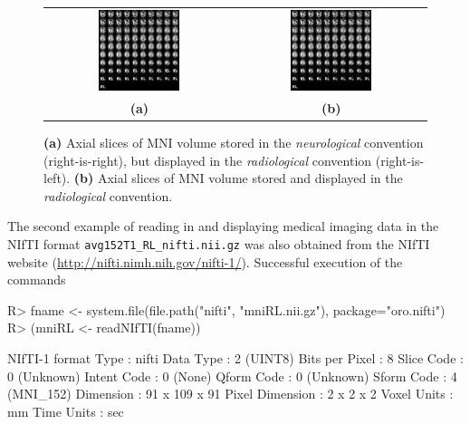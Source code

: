 \documentclass[
]{article}
\begin{document}
\begin{figure}[tbp]
  \begin{center}
    \begin{tabular}{cc}
      \includegraphics*[width=0.45\textwidth]{mniLR.jpeg} &
      \includegraphics*[width=0.45\textwidth]{mniRL.jpeg}\\
      \textbf{(a)} & \textbf{(b)}
    \end{tabular}
  \end{center}
  \caption{\textbf{(a)} Axial slices of MNI volume 
    stored in the \emph{neurological} convention (right-is-right), but
    displayed in the \emph{radiological} convention (right-is-left).
    \textbf{(b)} Axial slices of MNI volume  stored
    and displayed in the \emph{radiological} convention.}
  \label{fig:mniLR+mniRL}
\end{figure}

The second example of reading in and displaying medical imaging data in
the NIfTI format \texttt{avg152T1\_RL\_nifti.nii.gz} was also obtained
from the NIfTI website (\url{http://nifti.nimh.nih.gov/nifti-1/}).
Successful execution of the commands

\begin{CodeChunk}

\begin{CodeInput}
R> fname <- system.file(file.path("nifti", "mniRL.nii.gz"), package="oro.nifti")
R> (mniRL <- readNIfTI(fname))
\end{CodeInput}

\begin{CodeOutput}
NIfTI-1 format
  Type            : nifti
  Data Type       : 2 (UINT8)
  Bits per Pixel  : 8
  Slice Code      : 0 (Unknown)
  Intent Code     : 0 (None)
  Qform Code      : 0 (Unknown)
  Sform Code      : 4 (MNI_152)
  Dimension       : 91 x 109 x 91
  Pixel Dimension : 2 x 2 x 2
  Voxel Units     : mm
  Time Units      : sec
\end{CodeOutput}
\end{CodeChunk}
\end{document}
